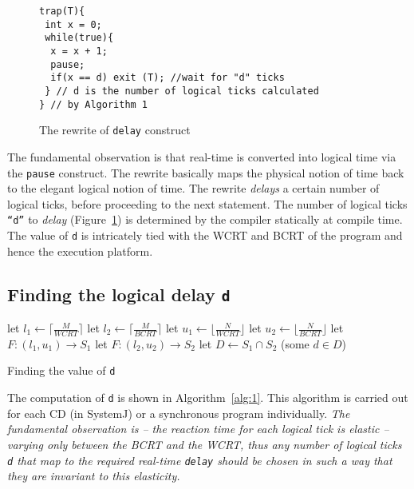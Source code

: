 \begin{figure}[tb]
    \begin{minipage}{\textwidth}
      \begin{scriptsize}
\begin{verbatim}
trap(T){
 int x = 0;
 while(true){
  x = x + 1;
  pause;
  if(x == d) exit (T); //wait for "d" ticks
 } // d is the number of logical ticks calculated
} // by Algorithm 1
\end{verbatim}
      \end{scriptsize}
    \end{minipage}
    \caption{The rewrite of \texttt{delay} construct}
    \label{fig:3}
\end{figure}

The fundamental observation is that real-time is converted into logical
time via the \texttt{pause} construct. The rewrite basically maps the
physical notion of time back to the elegant logical notion of time. The
rewrite \textit{delays} a certain number of logical ticks, before
proceeding to the next statement. The number of logical ticks
\texttt{``d''} to \textit{delay} (Figure~\ref{fig:3}) is determined by
the compiler statically at compile time. The value of \texttt{d} is
intricately tied with the WCRT and BCRT of the program and hence the
execution platform.

\subsection{Finding the logical delay \texttt{d}}
\label{sec:find-logic-delay}

\begin{algorithm}[t!]
  \begin{minipage}{1.0\linewidth}
    \SetAlgoLined
    let $l_1 \leftarrow \lceil \frac{M}{WCRT} \rceil$\;
    let $l_2 \leftarrow \lceil \frac{M}{BCRT} \rceil$\;
    let $u_1 \leftarrow \lfloor \frac{N}{WCRT} \rfloor$\;
    let $u_2 \leftarrow \lfloor \frac{N}{BCRT} \rfloor$\;
    let $F:(l_1,u_1) \rightarrow S_1$\;
    let $F:(l_2,u_2) \rightarrow S_2$\;
    let $D \leftarrow S_1 \cap S_2$\;
    \Return (some $d \in D$)\;
    \caption{Finding the value of \texttt{d}}
    \label{alg:1}
  \end{minipage}
\end{algorithm}

The computation of \texttt{d} is shown in Algorithm~\ref{alg:1}. This
algorithm is carried out for each CD (in SystemJ) or a synchronous
program individually. \textit{The fundamental observation is -- the
  reaction time for each logical tick is elastic -- varying only between
  the BCRT and the WCRT, thus any number of logical ticks \texttt{d}
  that map to the required real-time \texttt{delay} should be chosen in
  such a way that they are invariant to this elasticity.}


